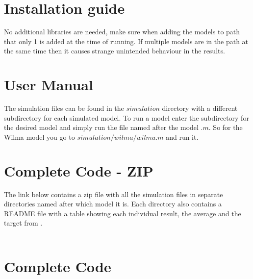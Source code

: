 \documentclass[english]{article}
\begin{document}
\begin{appendices}


\section{Installation guide}
No additional libraries are needed, make sure when adding the models to path that only 1 is added at the time of running. If multiple models are in the path at the same time then it causes strange unintended behaviour in the results.

\section{User Manual}
The simulation files can be found in the $simulation$ directory with a different subdirectory for each simulated model. To run a model enter the subdirectory for the desired model and simply run the file named after the model $.m$. So for the Wilma model you go to $simulation/wilma/wilma.m$ and run it.

\section{Complete Code - ZIP}
The link below contains a zip file with all the simulation files in separate directories named after which model it is. Each directory also contains a README file with a table showing each individual result, the average and the target from .
\\
\\

\section{Complete Code}



\end{appendices}
\end{document}
